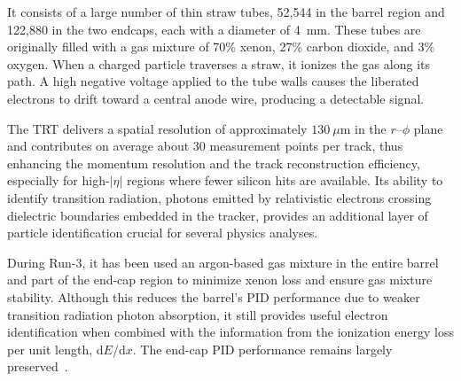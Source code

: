 It consists of a large number of thin straw tubes, 52,544 in the barrel region and 122,880 in the two endcaps, each with a diameter of 4~mm. These tubes are originally filled with a gas mixture of 70\% xenon, 27\% carbon dioxide, and 3\% oxygen. When a charged particle traverses a straw, it ionizes the gas along its path. A high negative voltage applied to the tube walls causes the liberated electrons to drift toward a central anode wire, producing a detectable signal. 

The TRT delivers a spatial resolution of approximately $130~\mu\text{m}$ in the $r\text{--}\phi$ plane and contributes on average about 30 measurement points per track, thus enhancing the momentum resolution and the track reconstruction efficiency, especially for high-$|\eta|$ regions where fewer silicon hits are available. Its ability to identify transition radiation, photons emitted by relativistic electrons crossing dielectric boundaries embedded in the tracker, provides an additional layer of particle identification crucial for several physics analyses.

During Run-3, it has been used an argon-based gas mixture in the entire barrel and part of the end-cap region to minimize xenon loss and ensure gas mixture stability. Although this reduces the barrel's PID performance due to weaker transition radiation photon absorption, it still provides useful electron identification when combined with the information from the ionization energy loss per unit length, d$E$/d$x$. The end-cap PID performance remains largely preserved~\cite{ATLAS_run3}.

